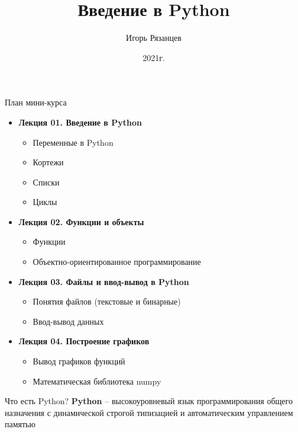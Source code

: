 \documentclass[12pt]{beamer}
\author{Игорь Рязанцев}
\title{Введение в Python}
\institute{Лекция 01}
\date{2021г.}
\begin{document}
\begin{frame}
\titlepage
\end{frame}

\begin{frame}{План мини-курса}
\begin{itemize}
\item \textbf{Лекция 01. Введение в Python}
	\begin{itemize}
	\item Переменные в Python
	\item Кортежи
	\item Списки	
	\item Циклы	
	\end{itemize}
\item \textbf{Лекция 02. Функции и объекты} \href{python_mini_course_02.pdf}{}
	\begin{itemize}
	\item Функции
	\item Объектно-ориентированное программирование	
	\end{itemize}
\item \textbf{Лекция 03. Файлы и ввод-вывод в Python} \href{python_mini_course_03.pdf}{}
	\begin{itemize}
	\item Понятия файлов (текстовые и бинарные)
	\item Ввод-вывод данных
	\end{itemize}
\item \textbf{Лекция 04. Построение графиков} \href{python_mini_course_04.pdf}{}
	\begin{itemize}
	\item Вывод графиков функций 
	\item Математическая библиотека numpy
	\end{itemize}
\end{itemize}
\end{frame}


\begin{frame}{Что есть Python?}
\textbf{Python} -- высокоуровневый язык программирования общего назначения с динамической строгой типизацией и автоматическим управлением памятью 
\end{frame}
\end{document}
